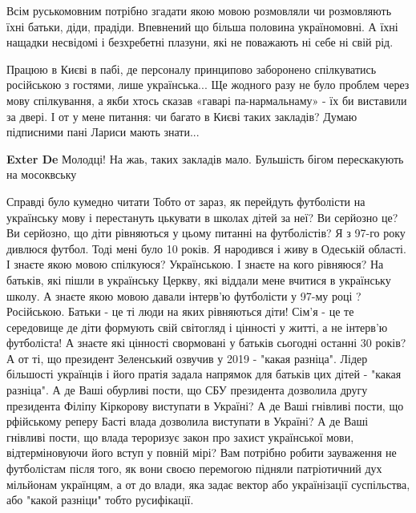 \begin{itemize}
Всім руськомовним потрібно згадати якою мовою розмовляли чи розмовляють їхні
батьки, діди, прадіди. Впевнений що більша половина україномовні. А їхні
нащадки несвідомі і безхребетні плазуни, які не поважають ні себе ні свій рід.


 

Працюю в Києві в пабі, де персоналу принципово заборонено спілкуватись
російською з гостями, лише українська... Ще жодного разу не було проблем через
мову спілкування, а якби хтось сказав «гаварі па-нармальнаму» - їх би виставили
за двері. І от у мене питання: чи багато в Києві таких закладів? Думаю
підписними пані Лариси мають знати...

\begin{itemize}
 
\textbf{Exter De} Молодці! На жаь, таких закладів мало. Бульшість бігом перескакують на мосоквську
\end{itemize}

 

Справді було кумедно читати \Smiley[1.0][yellow] Тобто от зараз, як перейдуть футболісти на
українську мову і перестануть цькувати в школах дітей за неї? Ви серйозно це?
Ви серйозно, що діти рівняються у цьому питанні на футболістів? Я з 97-го року
дивлюся футбол. Тоді мені було 10 років. Я народився і живу в Одеській області.
І знаєте якою мовою спілкуюся? Українською. І знаєте на кого рівняюся? На
батьків, які пішли в українську Церкву, які віддали мене вчитися в українську
школу. А знаєте якою мовою давали інтерв'ю футболісти у 97-му році ?
Російською. Батьки - це ті люди на яких рівняються діти! Сім'я - це те
середовище де діти формують свій світогляд і цінності у житті, а не інтерв'ю
футболіста! А знаєте які цінності свормовані у батьків сьогодні останні 30
років? А от ті, що президент Зеленський озвучив у 2019 - "какая разніца". Лідер
більшості українців і його пратія задала напрямок для батьків цих дітей -
"какая разніца". А де Ваші обурливі пости, що СБУ президента дозволила другу
президента Філіпу Кіркорову виступати в Україні? А де Ваші гнівливі пости, що
рфійському реперу Басті влада дозволила виступати в Україні? А де Ваші гнівливі
пости, що влада тероризує закон про захист української мови, відтерміновуючи
його вступ у повній мірі? Вам потрібно робити зауваження не футболістам після
того, як вони своєю перемогою підняли патріотичний дух мільйонам українцям, а
от до влади, яка задає вектор або українізації суспільства, або "какой разніци"
тобто русифікації.


\end{itemize}
